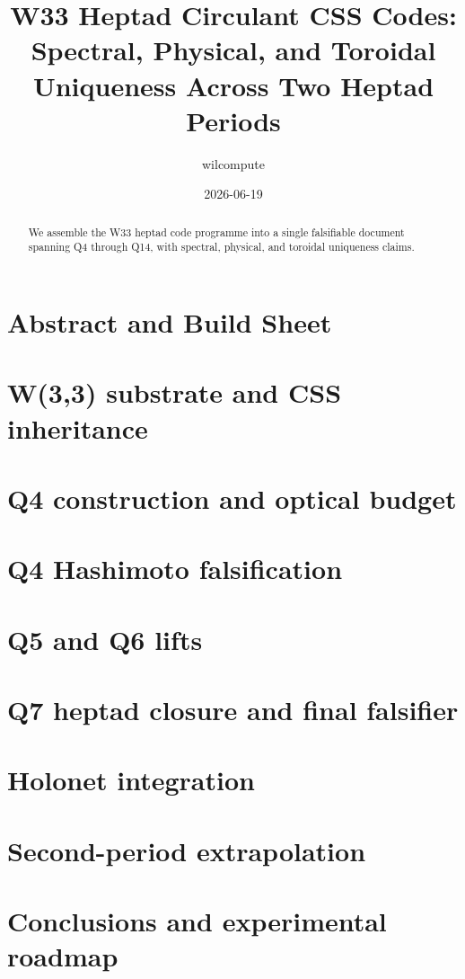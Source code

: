 \documentclass[11pt]{article}
\title{W33 Heptad Circulant CSS Codes: Spectral, Physical, and Toroidal Uniqueness Across Two Heptad Periods}
\author{wilcompute}
\date{2026-06-19}
\begin{document}
\maketitle
\begin{abstract}
We assemble the W33 heptad code programme into a single falsifiable document spanning Q4 through Q14, with spectral, physical, and toroidal uniqueness claims.
\end{abstract}
\section{Abstract and Build Sheet}
\section{W(3,3) substrate and CSS inheritance}
\section{Q4 construction and optical budget}
\section{Q4 Hashimoto falsification}
\section{Q5 and Q6 lifts}

\section{Q7 heptad closure and final falsifier}
\section{Holonet integration}
\section{Second-period extrapolation}
\section{Conclusions and experimental roadmap}
\end{document}
